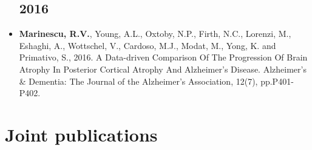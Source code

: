 \documentclass[a4paper,10pt]{article} %
\begin{document}
\begin{itemize}
\subsection*{2016}
\item[\poster] \textbf{Marinescu, R.V.}, Young, A.L., Oxtoby, N.P., Firth, N.C., Lorenzi, M., Eshaghi, A., Wottschel, V., Cardoso, M.J., Modat, M., Yong, K. and Primativo, S., 2016. A Data-driven Comparison Of The Progression Of Brain Atrophy In Posterior Cortical Atrophy And Alzheimer's Disease. Alzheimer's \& Dementia: The Journal of the Alzheimer's Association, 12(7), pp.P401-P402.
\end{itemize}

\section*{Joint publications}
\end{document}

